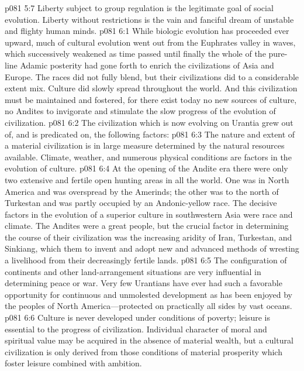 \vs p081 5:7 Liberty subject to group regulation is the legitimate goal of social evolution. Liberty without restrictions is the vain and fanciful dream of unstable and flighty human minds.
\vs p081 6:1 While biologic evolution has proceeded ever upward, much of cultural evolution went out from the Euphrates valley in waves, which successively weakened as time passed until finally the whole of the pure\hyp{}line Adamic posterity had gone forth to enrich the civilizations of Asia and Europe. The races did not fully blend, but their civilizations did to a considerable extent mix. Culture did slowly spread throughout the world. And this civilization must be maintained and fostered, for there exist today no new sources of culture, no Andites to invigorate and stimulate the slow progress of the evolution of civilization.\plusone
\pc \vs p081 6:2 The civilization which is now evolving on Urantia grew out of, and is predicated on, the following factors:
\pc \vs p081 6:3 \bibnobreakspace {} The nature and extent of a material civilization is in large measure determined by the natural resources available. Climate, weather, and numerous physical conditions are factors in the evolution of culture.
\vs p081 6:4 At the opening of the Andite era there were only two extensive and fertile open hunting areas in all the world. One was in North America and was overspread by the Amerinds; the other was to the north of Turkestan and was partly occupied by an Andonic\hyp{}yellow race. The decisive factors in the evolution of a superior culture in southwestern Asia were race and climate. The Andites were a great people, but the crucial factor in determining the course of their civilization was the increasing aridity of Iran, Turkestan, and Sinkiang, which  them to invent and adopt new and advanced methods of wresting a livelihood from their decreasingly fertile lands.
\vs p081 6:5 The configuration of continents and other land\hyp{}arrangement situations are very influential in determining peace or war. Very few Urantians have ever had such a favorable opportunity for continuous and unmolested development as has been enjoyed by the peoples of North America---protected on practically all sides by vast oceans.
\pc \vs p081 6:6 \bibnobreakspace {} Culture is never developed under conditions of poverty; leisure is essential to the progress of civilization. Individual character of moral and spiritual value may be acquired in the absence of material wealth, but a cultural civilization is only derived from those conditions of material prosperity which foster leisure combined with ambition.
